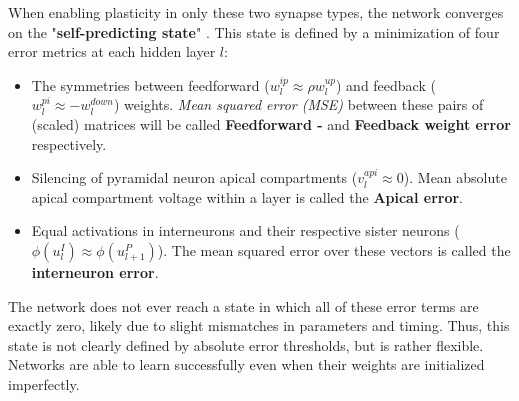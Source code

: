 When enabling plasticity in only these two synapse types, the network converges on the "\textbf{self-predicting state}"
\citep{sacramento2018dendritic}. This state is defined by a minimization of four error metrics at each hidden layer $l$:

\begin{itemize}
  \item The symmetries between feedforward ($w_l^{ip} \approx \rho w_l^{up}$) and feedback ($w_l^{pi} \approx
          -w_l^{down}$) weights. \textit{Mean squared error (MSE)} between these pairs of (scaled) matrices will be
          called \textbf{Feedforward - } and \textbf{Feedback weight error} respectively.
  \item Silencing of pyramidal neuron apical compartments ($v_l^{api} \approx 0$). Mean absolute apical compartment
        voltage within a layer is called the \textbf{Apical error}.
  \item Equal activations in interneurons and their respective sister neurons ($\phi (u_l^I) \approx \phi (u_{l+1}^P)$).
        The mean squared error over these vectors is called the \textbf{interneuron error}.
\end{itemize}

The network does not ever reach a state in which all of these error terms are exactly zero, likely due to slight
mismatches in parameters and timing. Thus, this state is not clearly defined by absolute error thresholds, but is rather
flexible. Networks are able to learn successfully even when their weights are initialized imperfectly.


